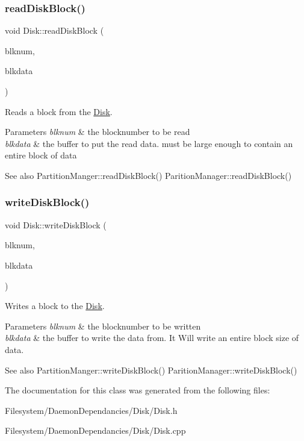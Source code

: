 \subsubsection{\texorpdfstring{read\+Disk\+Block()}{readDiskBlock()}}
{\footnotesize\ttfamily void Disk\+::read\+Disk\+Block (\begin{DoxyParamCaption}\item[{Blk\+Num\+Type}]{blknum,  }\item[{char $\ast$}]{blkdata }\end{DoxyParamCaption})}

Reads a block from the \mbox{\hyperlink{classDisk}{Disk}}. 
\begin{DoxyParams}{Parameters}
{\em blknum} & the blocknumber to be read \\
\hline
{\em blkdata} & the buffer to put the read data. must be large enough to contain an entire block of data \\
\hline
\end{DoxyParams}
\begin{DoxySeeAlso}{See also}
Partition\+Manger\+::read\+Disk\+Block() Parition\+Manager\+::read\+Disk\+Block() 
\end{DoxySeeAlso}
\mbox{\label{classDisk_a5d335138f56e6b87c8ebc4b6473183e7}} 
\subsubsection{\texorpdfstring{write\+Disk\+Block()}{writeDiskBlock()}}
{\footnotesize\ttfamily void Disk\+::write\+Disk\+Block (\begin{DoxyParamCaption}\item[{Blk\+Num\+Type}]{blknum,  }\item[{char $\ast$}]{blkdata }\end{DoxyParamCaption})}

Writes a block to the \mbox{\hyperlink{classDisk}{Disk}}. 
\begin{DoxyParams}{Parameters}
{\em blknum} & the blocknumber to be written \\
\hline
{\em blkdata} & the buffer to write the data from. It Will write an entire block size of data. \\
\hline
\end{DoxyParams}
\begin{DoxySeeAlso}{See also}
Partition\+Manger\+::write\+Disk\+Block() Parition\+Manager\+::write\+Disk\+Block() 
\end{DoxySeeAlso}


The documentation for this class was generated from the following files\+:\begin{DoxyCompactItemize}
\item 
Filesystem/\+Daemon\+Dependancies/\+Disk/Disk.\+h\item 
Filesystem/\+Daemon\+Dependancies/\+Disk/Disk.\+cpp\end{DoxyCompactItemize}
